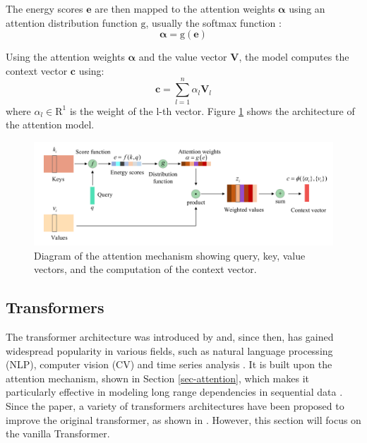 The energy scores $\boldsymbol{e}$ are then mapped to the attention weights $\boldsymbol{\alpha}$ using an attention distribution function $\mathrm{g}$, usually the softmax function \cite{NIU202148}:
\begin{equation}
    \boldsymbol{\alpha} = \mathrm{g}(\boldsymbol{e})
\end{equation}

Using the attention weights $\boldsymbol{\alpha}$ and the value vector $\boldsymbol{V}$, the model computes the context vector $\boldsymbol{c}$ using:
\begin{equation}
    \boldsymbol{c} = \sum_{l=1}^{n} \alpha_l \boldsymbol{V}_l  
\end{equation}
where $\alpha_l \in \mathrm{R}^1$ is the weight of the l-th vector. Figure \ref{fig:Attention-struct} shows the architecture of the attention model.

\begin{figure}[H]
    \centering
    \includegraphics[width=12cm]{Cap2_LitReview/model_basics/Attention/attention-struct.png}
    \caption{Diagram of the attention mechanism showing query, key, value vectors, and the computation of the context vector. \cite{NIU202148}}
    \label{fig:Attention-struct}
\end{figure}

\subsection{Transformers}

The transformer architecture was introduced by \cite{vaswani2023attentionneed} and, since then, has gained widespread popularity in various fields, such as natural language processing (NLP), computer vision (CV) and time series analysis \cite{lin2021surveytransformers,wen2023transformerstimeseriessurvey}. It is built upon the attention mechanism, shown in Section \ref{sec-attention}, which makes it particularly effective in modeling long range dependencies in sequential data \cite{wen2023transformerstimeseriessurvey}. Since the \cite{vaswani2023attentionneed} paper, a variety of transformers architectures have been proposed to improve the original transformer, as shown in \cite{lin2021surveytransformers}. However, this section will focus on the vanilla Transformer.

